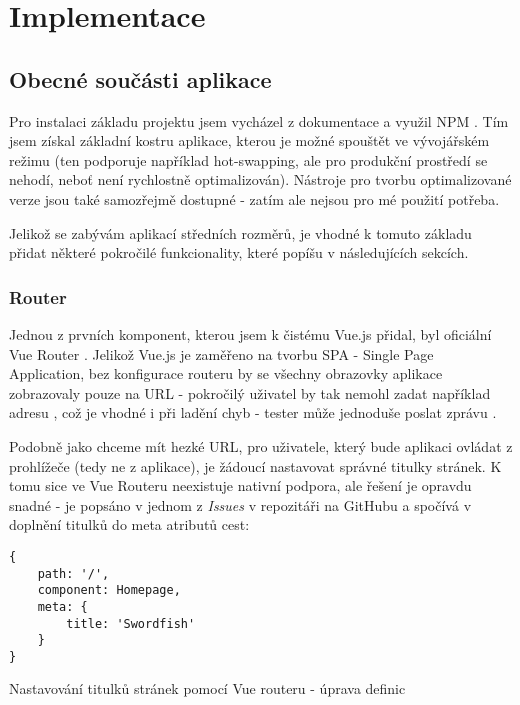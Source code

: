 \chapter{Implementace}\label{implementation}

\section{Obecné součásti aplikace}

Pro instalaci základu projektu jsem vycházel z dokumentace \cite{vue-doc} a využil NPM \cite{npm}. Tím jsem získal základní kostru aplikace, kterou je možné spouštět ve vývojářském režimu (ten podporuje například hot-swapping, ale pro produkční prostředí se nehodí, neboť není rychlostně optimalizován). Nástroje pro tvorbu optimalizované verze jsou také samozřejmě dostupné - zatím ale nejsou pro mé použití potřeba.

Jelikož se zabývám aplikací středních rozměrů, je vhodné k tomuto základu přidat některé pokročilé funkcionality, které popíšu v následujících sekcích.


\subsection{Router}

Jednou z prvních komponent, kterou jsem k čistému Vue.js přidal, byl oficiální Vue Router \cite{vue-router}. Jelikož Vue.js je zaměřeno na tvorbu SPA - Single Page Application, bez konfigurace routeru by se všechny obrazovky aplikace zobrazovaly pouze na URL \code{/} - pokročilý uživatel by tak nemohl zadat například adresu , což je vhodné i při ladění chyb - tester může jednoduše poslat zprávu \emph{}.

Podobně jako chceme mít hezké URL, pro uživatele, který bude aplikaci ovládat z prohlížeče (tedy ne z aplikace), je žádoucí nastavovat správné titulky stránek. K tomu sice ve Vue Routeru neexistuje nativní podpora, ale řešení je opravdu snadné - je popsáno v jednom z \emph{Issues} v repozitáři na GitHubu \cite{vue-router-title} a spočívá v doplnění titulků do meta atributů cest:

\begin{listing}[H]
\begin{verbatim}
{
    path: '/',
    component: Homepage,
    meta: {
        title: 'Swordfish'
    }
}
\end{verbatim}
\caption{Nastavování titulků stránek pomocí Vue routeru - úprava definic} \label{code:vue-router-title1}
\end{listing}


